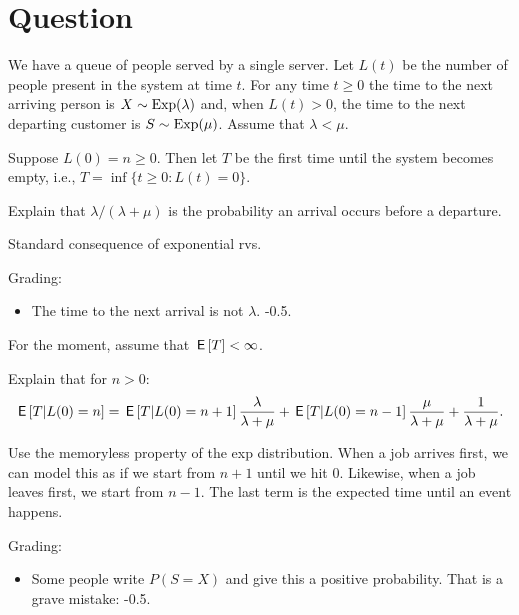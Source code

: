 \section*{Question}



We have a queue of people served by a single server. Let $L(t)$ be the number of people present in the system at time $t$.
For any time $t\geq 0$ the time to the next arriving person is $X\sim\mathrm{Exp}(\lambda)$ and, when $L(t)>0$, the time to the next departing customer is $S\sim\mathrm{Exp}(\mu)$. Assume that $\lambda < \mu$.

Suppose $L(0)=n\geq 0$. Then let $T$ be the first time until the system becomes empty, i.e., $T=\inf\{t\geq 0 : L(t) = 0\}$.


\begin{exercise}[1]
Explain that $\lambda/(\lambda+\mu)$ is the probability an arrival occurs before a departure.
\begin{solution}
  Standard consequence of exponential rvs.

Grading:
\begin{itemize}
\item The time to the next arrival is not $\lambda$. -0.5.
\end{itemize}
\end{solution}
\end{exercise}

For the moment, assume that $\,\mathsf{E}\left[T\right] < \infty$.

\begin{exercise}[1]
Explain that  for $n>0$:
\begin{equation}
\,\mathsf{E}\left[T|L(0)=n\right]   = \,\mathsf{E}\left[T|L(0)=n+1\right] \frac{\lambda}{\lambda + \mu} +\,\mathsf{E}\left[T|L(0)=n-1\right] \frac{\mu}{\lambda + \mu} +\frac{1}{\lambda + \mu}.
\end{equation}
\begin{solution}
Use the memoryless property of the exp distribution. When a job arrives first, we can model this as if we start from $n+1$ until we hit $0$. Likewise, when a job leaves first, we start from $n-1$. The last term is the expected time until an event happens.

Grading:
\begin{itemize}
\item Some people write $P(S=X)$ and give this a positive probability. That is a grave mistake: -0.5.
\end{itemize}
\end{solution}
\end{exercise}

